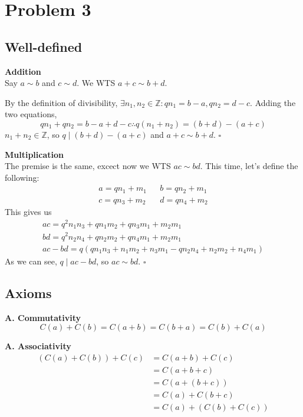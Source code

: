 \documentclass[12pt]{article}
\begin{document}
\pagebreak

\section{Problem 3}

\subsection{Well-defined}

\textbf{Addition} \\
Say $a \sim b$ and $c \sim d$.
We WTS $a+c \sim b+d$.

By the definition of divisibility, $\exists n_1, n_2 \in \mathbb{Z}: qn_1=b-a, qn_2=d-c$.
Adding the two equations,
\[qn_1+qn_2=b-a+d-c \therefore q(n_1+n_2)=(b+d)-(a+c)\]
$n_1+n_2 \in \mathbb{Z}$, so $q \mid (b+d)-(a+c)$ and $a+c \sim b+d$. $\square$

\textbf{Multiplication} \\
The premise is the same, excect now we WTS $ac \sim bd$.
This time, let's define the following:
\begin{align*}
      a=qn_1+m_1 &  & b=qn_2+m_1 \\
      c=qn_3+m_2 &  & d=qn_4+m_2
\end{align*}
This gives us
\begin{gather*}
      ac=q^2n_1n_3+qn_1m_2+qn_3m_1+m_2m_1 \\
      bd=q^2n_2n_4+qn_2m_2+qn_4m_1+m_2m_1 \\
      ac-bd=q(qn_1n_3+n_1m_2+n_3m_1-qn_2n_4+n_2m_2+n_4m_1)
\end{gather*}
As we can see, $q \mid ac-bd$, so $ac \sim bd$. $\square$

\pagebreak

\subsection{Axioms}

\textbf{A. Commutativity}
\[C(a)+C(b)=C(a+b)=C(b+a)=C(b)+C(a)\]

\textbf{A. Associativity}
\begin{align*}
      (C(a)+C(b))+C(c)
       & = C(a+b)+C(c)      \\
       & = C(a+b+c)         \\
       & = C(a+(b+c))       \\
       & = C(a)+C(b+c)      \\
       & = C(a)+(C(b)+C(c))
\end{align*}
\end{document}
